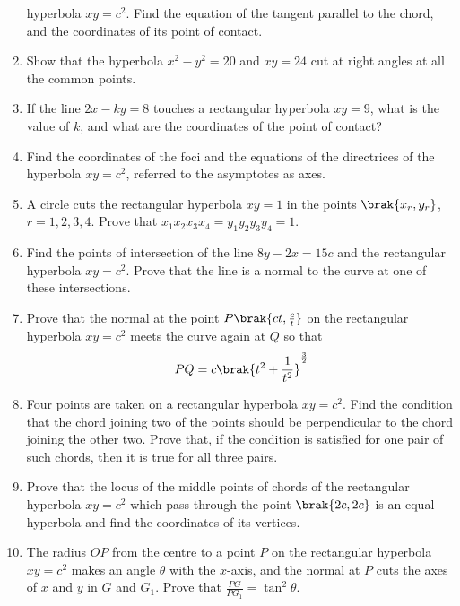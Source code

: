 \begin{enumerate}[1.]
hyperbola $xy=c^2$.  Find the equation of the tangent parallel to the chord, and the coordinates
of its point of contact.
\item Show that the hyperbola $x^2-y^2=20$ and $xy=24$ cut at right angles at all the common points.
\item If the line $2x-ky=8$ touches a rectangular hyperbola $xy=9$, what is the value of $k$, and
what are the coordinates of the point of contact?
\item Find the coordinates of the foci and the equations of the directrices of the 
hyperbola $xy=c^2$, referred to the asymptotes as axes.
\item A circle cuts the rectangular hyperbola $xy=1$ in the points $\brak{x_r,y_r}$, $r=1,2,3,4$.  Prove 
that $x_1x_2x_3x_4 = y_1y_2y_3y_4=1$.
\item Find the points of intersection of the line $8y-2x=15c$ and the rectangular hyperbola $xy=c^2$.  Prove
that the line is a normal to the curve at one of these intersections.
\item Prove that the normal at the point $P \brak{ct,\frac{c}{t}}$ on the rectangular hyperbola $xy=c^2$
meets the curve again at $Q$ so that
\begin{equation}
PQ=c\brak{t^2+\frac{1}{t^2}}^{\frac{3}{2}}
\end{equation}
\item Four points are taken on a rectangular hyperbola $xy=c^2$.  Find the condition that
the chord joining two of the points should be perpendicular to the chord joining
the other two.  Prove that, if the condition is satisfied for one pair of such chords, then
it is true for all three pairs.
\item Prove that the locus of the middle points of chords of the rectangular
hyperbola $xy=c^2$ which pass through the point $\brak{2c,2c}$ is an equal hyperbola and find the coordinates
of its vertices.
\item The radius $OP$ from the centre to a point $P$ on the rectangular hyperbola $xy=c^2$ makes
an angle $\theta$ with the $x$-axis, and the normal at $P$ cuts the axes of $x$ and $y$ in $G$ and $G_1$.
Prove that $\frac{PG}{PG_1}=\tan^2\theta$.
\end{enumerate}
